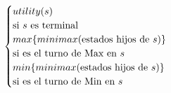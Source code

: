 \documentclass[preview]{standalone}
\begin{document}
\begin{align*}
\begin{cases}
                                 utility(s) \qquad \cr \text{si $s$ es terminal} \cr
                                 max\{minimax(\text{estados hijos de $s$})\}\qquad \cr \text{si es el turno de Max en $s$} \cr
                                 min\{minimax(\text{estados hijos de $s$})\}\qquad \cr \text{si es el turno de Min en $s$} \cr
                                 \end{cases}
\end{align*}
\end{document}
